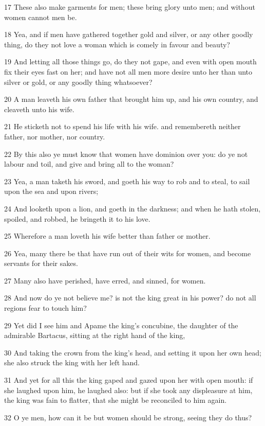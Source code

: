 \par 17 These also make garments for men; these bring glory unto men; and without women cannot men be.
\par 18 Yea, and if men have gathered together gold and silver, or any other goodly thing, do they not love a woman which is comely in favour and beauty?
\par 19 And letting all those things go, do they not gape, and even with open mouth fix their eyes fast on her; and have not all men more desire unto her than unto silver or gold, or any goodly thing whatsoever?
\par 20 A man leaveth his own father that brought him up, and his own country, and cleaveth unto his wife.
\par 21 He sticketh not to spend his life with his wife. and remembereth neither father, nor mother, nor country.
\par 22 By this also ye must know that women have dominion over you: do ye not labour and toil, and give and bring all to the woman?
\par 23 Yea, a man taketh his sword, and goeth his way to rob and to steal, to sail upon the sea and upon rivers;
\par 24 And looketh upon a lion, and goeth in the darkness; and when he hath stolen, spoiled, and robbed, he bringeth it to his love.
\par 25 Wherefore a man loveth his wife better than father or mother.
\par 26 Yea, many there be that have run out of their wits for women, and become servants for their sakes.
\par 27 Many also have perished, have erred, and sinned, for women.
\par 28 And now do ye not believe me? is not the king great in his power? do not all regions fear to touch him?
\par 29 Yet did I see him and Apame the king's concubine, the daughter of the admirable Bartacus, sitting at the right hand of the king,
\par 30 And taking the crown from the king's head, and setting it upon her own head; she also struck the king with her left hand.
\par 31 And yet for all this the king gaped and gazed upon her with open mouth: if she laughed upon him, he laughed also: but if she took any displeasure at him, the king was fain to flatter, that she might be reconciled to him again.
\par 32 O ye men, how can it be but women should be strong, seeing they do thus?
